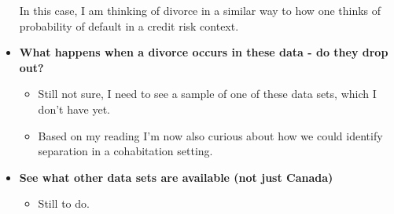 \documentclass{article}
\begin{document}
\begin{itemize}
In this case, I am thinking of divorce in a similar way to how one thinks of probability of default in a credit risk context.


\item \textbf{What happens when a divorce occurs in these data - do they drop out?}
\begin{itemize}
\item Still not sure, I need to see a sample of one of these data sets, which I don't have yet.
\item Based on my reading I'm now also curious about how we could identify separation in a cohabitation setting.
\end{itemize}

\item \textbf{See what other data sets are available (not just Canada)}
\begin{itemize}
\item Still to do.
\end{itemize}

\end{itemize}

\newpage
\end{document}
